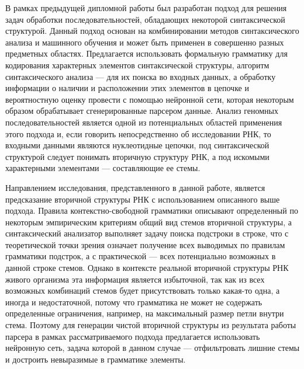 В рамках предыдущей дипломной работы был разработан подход для решения задач обработки последовательностей, обладающих некоторой синтаксической структурой. Данный подход основан на комбинировании методов синтаксического анализа и машинного обучения и может быть применен в совершенно разных предметных областях. Предлагается использовать формальную грамматику для кодирования характерных элементов синтаксической структуры, алгоритм синтаксического анализа --- для их поиска во входных данных, а обработку информации о наличии и расположении этих элементов в цепочке и вероятностную оценку провести с помощью нейронной сети, которая некоторым образом обрабатывает сгенерированные парсером данные. Анализ геномных последовательностей является одной из потенциальных областей применения этого подхода и, если говорить непосредственно об исследовании РНК, то входными данными являются нуклеотидные цепочки, под синтаксической структурой следует понимать вторичную структуру РНК, а под искомыми характерными элементами --- составляющие ее стемы. 

Направлением исследования, представленного в данной работе, является предсказание вторичной структуры РНК с использованием описанного выше подхода. Правила контекстно-свободной грамматики описывают определенный по некоторым эмпирическим критериям общий вид стемов вторичной структуры, а синтаксический анализатор выполняет задачу поиска подстроки в строке, что с теоретической точки зрения означает получение всех выводимых по правилам грамматики подстрок, а с практической --- всех потенциально возможных в данной строке стемов. Однако в контексте реальной вторичной структуры РНК живого организма эта информация является избыточной, так как из всех возможных комбинаций стемов будет присутствовать только какая-то одна, а иногда и недостаточной, потому что грамматика не может не содержать определенные ограничения, например, на максимальный размер петли внутри стема. Поэтому для генерации чистой вторичной структуры из результата работы парсера в рамках рассматриваемого подхода предлагается использовать нейронную сеть, задача которой в данном случае --- отфильтровать лишние стемы и достроить невыразимые в грамматике элементы.